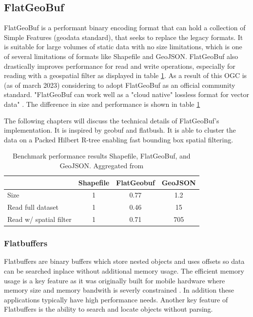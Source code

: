 \subsection{FlatGeoBuf}
\label{subsec:fgb}
FlatGeoBuf is a performant binary encoding format that can hold a collection of Simple Features (geodata standard), that seeks to replace the legacy formats. It is suitable for large volumes of static data with no size limitations, which is one of several limitations of formats like Shapefile and GeoJSON. FlatGeoBuf also drastically improves performance for read and write operations, especially for reading with a geospatial filter as displayed in table \ref{fgb_vs_legacy}. As a result of this OGC is (as of march 2023) considering to adopt FlatGeoBuf as an official community standard. "FlatGeoBuf can work well as a "cloud native" lossless format for vector data" \cite{fgb_community_standard}. The difference in size and performance is shown in table \ref{fgb_vs_legacy}

The following chapters will discuss the technical details of FlatGeoBuf's implementation. It is inspired by geobuf and flatbush. It is able to cluster the data on a Packed Hilbert R-tree enabling fast bounding box spatial filtering.
\begin{table}
    \centering
    \begin{tabular}{ |l|ccc| }
        \hline
                               & Shapefile & FlatGeobuf & GeoJSON \\
        \hline
        Size                   & 1         & 0.77       & 1.2     \\
        \hline
        Read full dataset      & 1         & 0.46       & 15      \\
        \hline
        Read w/ spatial filter & 1         & 0.71       & 705     \\
        \hline
    \end{tabular}
    \caption{Benchmark performance results Shapefile, FlatGeoBuf, and GeoJSON. Aggregated from \cite{fgb_org}}
    \label{fgb_vs_legacy}
\end{table}
\subsubsection{Flatbuffers}
Flatbuffers are binary buffers which store nested objects and uses offsets so data can be searched inplace without additional memory usage. The efficient memory usage is a key feature as it was originally built for mobile hardware where memory size and memory bandwith is severly constrained \cite{flatbuffers_white_paper}. In addition these applications typically have high performance needs. Another key feature of Flatbuffers is the ability to search and locate objects without parsing.

